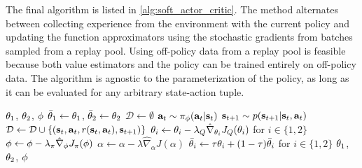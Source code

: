 The final algorithm is listed in \autoref{alg:soft_actor_critic}. The method alternates between collecting experience from the environment with the current policy and updating the function approximators using the stochastic gradients from batches sampled from a replay pool. Using off-policy data from a replay pool is feasible because both value estimators and the policy can be trained entirely on off-policy data. The algorithm is agnostic to the parameterization of the policy, as long as it can be evaluated for any arbitrary state-action tuple.


%


%

\begin{algorithm}[tb]
\caption{Soft Actor-Critic}
\label{alg:soft_actor_critic}
\begin{algorithmic}
\Require $\theta_1$, $\theta_2$, ${\phi}$ 
\State $\bar {\theta}_1 \leftarrow \theta_1$, $\bar {\theta}_2 \leftarrow \theta_2$ 
\State $\mathcal{D}\leftarrow\emptyset$ 
%
	    \State ${\mathbf{a}_t} \sim \pi_{\phi}({\mathbf{a}_t}|{\mathbf{s}_t})$ 
	    \State ${\mathbf{s}_{t+1}} \sim p({\mathbf{s}_{t+1}}| {\mathbf{s}_t}, {\mathbf{a}_t})$ 
	    \State $\mathcal{D} \leftarrow \mathcal{D} \cup \left\{({\mathbf{s}_t}, {\mathbf{a}_t}, r({\mathbf{s}_t}, {\mathbf{a}_t}), {\mathbf{s}_{t+1}})\right\}$ 
	\EndFor
	    \State $\theta_i \leftarrow \theta_i - \lambda_Q \hat \nabla_{\theta_i} J_Q(\theta_i)$ for $i\in\{1, 2\}$ 
	    \State ${\phi} \leftarrow {\phi} - \lambda_\pi \hat \nabla_{\phi} J_\pi({\phi})$
	    \State $\alpha \leftarrow \alpha - \lambda \hat \nabla_\alpha J(\alpha)$ 
	    \State $\bar{\theta}_i\leftarrow \tau \theta_i + (1-\tau)\bar{\theta}_i$ for $i\in\{1,2\}$
	\EndFor
\EndFor
\Ensure $\theta_1$, $\theta_2$, ${\phi}$
\end{algorithmic}
\end{algorithm}


